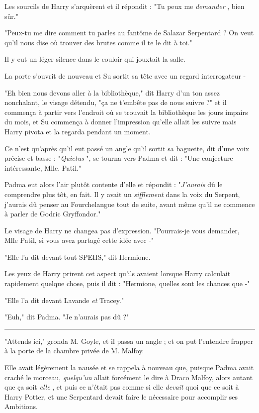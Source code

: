 Les sourcils de Harry s'arquèrent et il répondit : "Tu peux me \emph{demander} , bien sûr."

"Peux-tu me dire comment tu parles au fantôme de Salazar Serpentard ? On veut qu'il nous dise où trouver des brutes comme il te le dit à toi."

Il y eut un léger silence dans le couloir qui jouxtait la salle.

La porte s'ouvrit de nouveau et Su sortit sa tête avec un regard interrogateur -

"Eh bien nous devons aller à la bibliothèque," dit Harry d'un ton assez nonchalant, le visage détendu, "ça ne t'embête pas de nous suivre ?" et il commença à partir vers l'endroit où se trouvait la bibliothèque les jours impairs du mois, et Su commença à donner l'impression qu'elle allait les suivre mais Harry pivota et la regarda pendant un moment.

Ce n'est qu'après qu'il eut passé un angle qu'il sortit sa baguette, dit d'une voix précise et basse : "\emph{Quietus} ", se tourna vers Padma et dit : "Une conjecture intéressante, Mlle. Patil."

Padma eut alors l'air plutôt contente d'elle et répondit : "\emph{J'aurais}  dû le comprendre plus tôt, en fait. Il y avait un \emph{sifflement}  dans la voix du Serpent, j'aurais dû penser au Fourchelangue tout de suite, avant même qu'il ne commence à parler de Godric Gryffondor."

Le visage de Harry ne changea pas d'expression. "Pourrais-je vous demander, Mlle Patil, si vous avez partagé cette idée avec -"

"Elle l'a dit devant tout SPEHS," dit Hermione.

Les yeux de Harry prirent cet aspect qu'ils avaient lorsque Harry calculait rapidement quelque chose, puis il dit : "Hermione, quelles sont les chances que -"

"Elle l'a dit devant Lavande \emph{et}  Tracey."

"Euh," dit Padma. "Je n'aurais pas dû ?"
\par\noindent\rule{\textwidth}{0.4pt}
"Attends ici," gronda M. Goyle, et il passa un angle ; et on put l'entendre frapper à la porte de la chambre privée de M. Malfoy.

Elle avait légèrement la nausée et se rappela à nouveau que, puisque Padma avait craché le morceau, \emph{quelqu'un}  allait forcément le dire à Draco Malfoy, alors autant que ça soit \emph{elle} , et puis ce n'était pas comme si elle \emph{devait}  quoi que ce soit à Harry Potter, et une Serpentard devait faire le nécessaire pour accomplir ses Ambitions.

